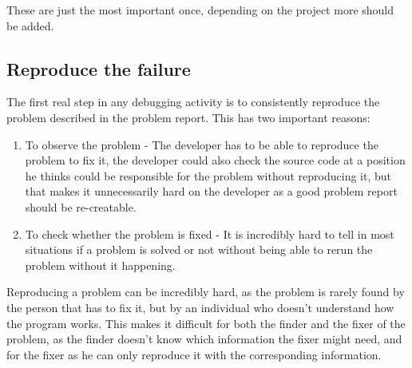 These are just the most important once, depending on the project more should be added.

\subsection{Reproduce the failure}
\label{aodZellerReproduce}
The first real step in any debugging activity is to consistently reproduce the problem described in the problem report. This has two important reasons:

\begin{enumerate}
  \item To observe the problem - The developer has to be able to reproduce the problem to fix it, the developer could also check the source code at a position he thinks could be responsible for the problem without reproducing it, but that makes it unnecessarily hard on the developer as a good problem report should be re-creatable.
  \item To check whether the problem is fixed - It is incredibly hard to tell in most situations if a problem is solved or not without being able to rerun the problem without it happening.
\end{enumerate}

Reproducing a problem can be incredibly hard, as the problem is rarely found by the person that has to fix it, but by an individual who doesn't understand how the program works. This makes it difficult for both the finder and the fixer of the problem, as the finder doesn't know which information the fixer might need, and for the fixer as he can only reproduce it with the corresponding information.


